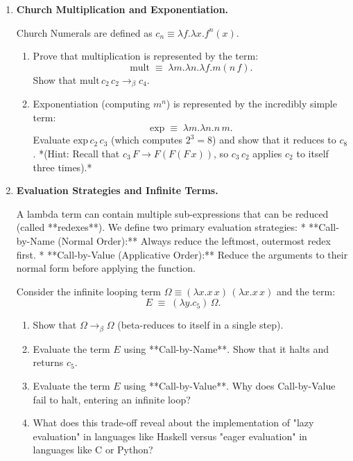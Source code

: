\documentclass[12pt, a4paper]{book}
\begin{document}
\begin{problembox}
\begin{enumerate}[label=\textbf{P\arabic*.}]
  \item \textbf{Church Multiplication and Exponentiation.}
  
        Church Numerals are defined as $c_n \equiv \lambda f. \lambda x. f^n(x)$.
        \begin{enumerate}[label=(\alph*)]
          \item Prove that multiplication is represented by the term:
                \[
                  \text{mult} \;\equiv\; \lambda m. \lambda n. \lambda f. m (n \, f).
                \]
                Show that $\text{mult} \, c_2 \, c_2 \to_\beta c_4$.
          \item Exponentiation (computing $m^n$) is represented by the incredibly simple term:
                \[
                  \text{exp} \;\equiv\; \lambda m. \lambda n. n \, m.
                \]
                Evaluate $\text{exp} \, c_2 \, c_3$ (which computes $2^3 = 8$) and show that it reduces to $c_8$.
                *(Hint: Recall that $c_3 \, F \to F (F (F \, x))$, so $c_3 \, c_2$ applies $c_2$ to itself three times).*
        \end{enumerate}

  \item \textbf{Evaluation Strategies and Infinite Terms.}
  
        A lambda term can contain multiple sub-expressions that can be reduced (called **redexes**). We define two primary evaluation strategies:
        * **Call-by-Name (Normal Order):** Always reduce the leftmost, outermost redex first.
        * **Call-by-Value (Applicative Order):** Reduce the arguments to their normal form before applying the function.
        
        Consider the infinite looping term $\Omega \equiv (\lambda x. x \, x) \, (\lambda x. x \, x)$ and the term:
        \[
          E \;\equiv\; (\lambda y. c_5) \, \Omega.
        \]
        \begin{enumerate}[label=(\alph*)]
          \item Show that $\Omega \to_\beta \Omega$ (beta-reduces to itself in a single step).
          \item Evaluate the term $E$ using **Call-by-Name**. Show that it halts and returns $c_5$.
          \item Evaluate the term $E$ using **Call-by-Value**.
                Why does Call-by-Value fail to halt, entering an infinite loop?
          \item What does this trade-off reveal about the implementation of "lazy evaluation" in languages like Haskell versus "eager evaluation" in languages like C or Python?
        \end{enumerate}
\end{enumerate}
\end{problembox}
\end{document}
